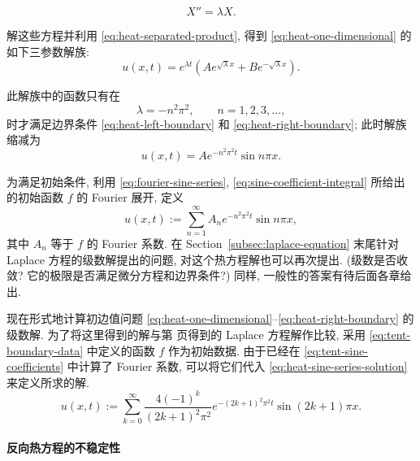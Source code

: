 \begin{equation}\label{eq:heat-separated-space-equation}
X''=\lambda X.
\end{equation}


解这些方程并利用 \eqref{eq:heat-separated-product}, 得到 \eqref{eq:heat-one-dimensional} 的如下三参数解族:
\begin{equation}\label{eq:heat-three-parameter-family}
u(x,t)=e^{\lambda t}(Ae^{\sqrt{\lambda}x}+Be^{-\sqrt{\lambda}x}).
\end{equation}


此解族中的函数只有在
\begin{equation}\label{eq:heat-boundary-eigenvalues}
\lambda=-n^2\pi^2,\qquad n=1,2,3,\ldots,
\end{equation}
时才满足边界条件 \eqref{eq:heat-left-boundary} 和 \eqref{eq:heat-right-boundary}; 此时解族缩减为
\begin{equation}\label{eq:heat-decaying-sine-modes}
u(x,t)=Ae^{-n^2\pi^2t}\sin n\pi x.
\end{equation}


为满足初始条件, 利用 \eqref{eq:fourier-sine-series}, \eqref{eq:sine-coefficient-integral} 所给出的初始函数 $f$ 的 Fourier 展开, 定义
\begin{equation}\label{eq:heat-sine-series-solution}
u(x,t):=\sum_{n=1}^{\infty}A_ne^{-n^2\pi^2t}\sin n\pi x,
\end{equation}
其中 $A_n$ 等于 $f$ 的 Fourier 系数. 在 Section~\ref{subsec:laplace-equation} 末尾针对 Laplace 方程的级数解提出的问题, 对这个热方程解也可以再次提出. (级数是否收敛? 它的极限是否满足微分方程和边界条件?) 同样, 一般性的答案有待后面各章给出.

\begin{Example}
\label{ex:heat-tent-data}
现在形式地计算初边值问题 \eqref{eq:heat-one-dimensional}--\eqref{eq:heat-right-boundary} 的级数解. 为了将这里得到的解与第 \pageref{ex:tent-dirichlet-data} 页得到的 Laplace 方程解作比较, 采用 \eqref{eq:tent-boundary-data} 中定义的函数 $f$ 作为初始数据. 由于已经在 \eqref{eq:tent-sine-coefficients} 中计算了 Fourier 系数, 可以将它们代入 \eqref{eq:heat-sine-series-solution} 来定义所求的解.
\begin{equation}\label{eq:heat-tent-data-solution}
u(x,t):=\sum_{k=0}^{\infty}\dfrac{4(-1)^k}{(2k+1)^2\pi^2}e^{-(2k+1)^2\pi^2t}\sin(2k+1)\pi x.
\end{equation}

\end{Example}

\paragraph*{反向热方程的不稳定性}

